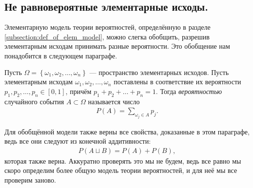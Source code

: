 \documentclass[../main.tex]{subfiles}
\begin{document}
\subsection{Не равновероятные элементарные исходы.}

Элементарную модель теории вероятностей, определённую в разделе \ref{subsection:def_of_elem_model}, можно слегка обобщить, разрешив элементарным исходам принимать разные вероятности. Это обобщение нам понадобится в следующем параграфе.

\begin{df}
 Пусть $\Omega = \left\{ \omega_1,\omega_2, \ldots, \omega_n \right\}$ --- пространство элементарных исходов. Пусть элементарным исходам $ \omega_1, \omega_2, \ldots, \omega_n $ поставлены в соответствие их вероятности $ p_1, p_2, \ldots, p_n \in [0,1] $, причём $p_1 + p_2 + \ldots + p_n = 1$. Тогда \textit{вероятностью} случайного события $ A \subset \Omega $ называется число
 \begin{align*}
  P(A) = \sum_{\omega_j \in A} p_j
 .\end{align*}
\end{df}

Для обобщённой модели также верны все свойства, доказанные в этом параграфе, ведь все они следуют из конечной аддитивности:
\begin{align*}
 P(A \sqcup B) = P(A) + P(B),
\end{align*} которая также верна. Аккуратно проверять это мы не будем, ведь все равно мы скоро определим более общую модель теории вероятностей, и для неё мы все проверим заново.
\end{document}
